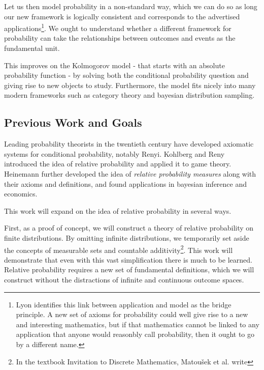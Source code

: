 \documentclass[twoside]{article}
\theoremstyle{plain}%
\theoremstyle{definition}
\theoremstyle{remark}
\begin{document}
Let us then model probability in a non-standard way, which we can do so as long our new framework is logically consistent and corresponds to the advertised applications\footnote{Lyon identifies this link between application and model as the bridge principle. A new set of axioms for probability could well give rise to a new and interesting mathematics, but if that mathematics cannot be linked to any application that anyone would reasonbly call probability, then it ought to go by a different name.}. We ought to understand whether a different framework for probability can take the relationships between outcomes and events as the fundamental unit.

This improves on the Kolmogorov model - that starts with an absolute probability function - by solving both the conditional probability question and giving rise to new objects to study. Furthermore, the model fits nicely into many modern frameworks such as category theory and bayesian distribution sampling.

\subsection{Previous Work and Goals}

Leading probability theorists in the twentieth century have developed axiomatic systems for conditional probability, notably Renyi\cite{renyi}. Kohlberg and Reny\cite{kohlberg} introduced the idea of relative probability and applied it to game theory. Heinemann\cite{heinemann} further developed the idea of \textit{relative probability measures} along with their axioms and definitions, and found applications in bayesian inference and economics\cite{heinemann_econ}.

This work will expand on the idea of relative probability in several ways.

First, as a proof of concept, we will construct a theory of relative probability on finite distributions. By omitting infinite distributions, we temporarily set aside the concepts of measurable sets and countable additivity\footnote{In the textbook Invitation to Discrete Mathematics, Matoušek et al. write }. This work will demonstrate that even with this vast simplification there is much to be learned. Relative probability requires a new set of fundamental definitions, which we will construct without the distractions of infinite and continuous outcome spaces.
\end{document}
